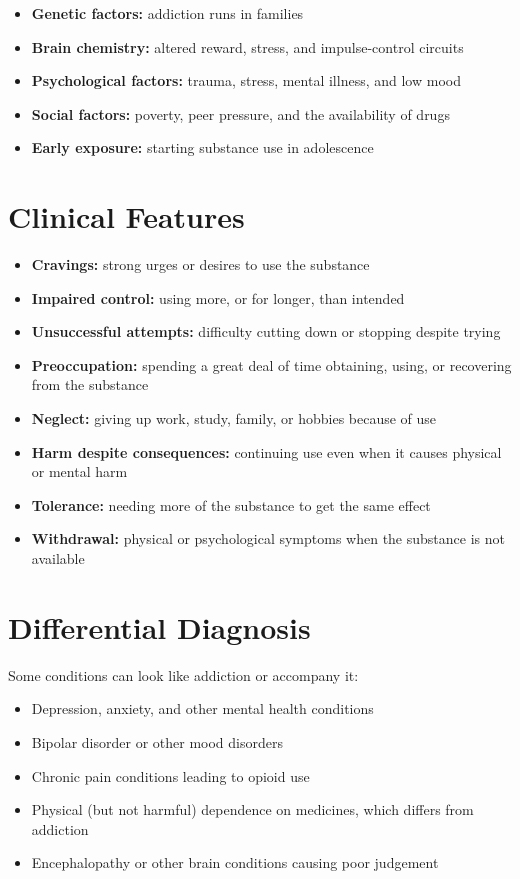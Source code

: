 \begin{itemize}
    \item \textbf{Genetic factors:} addiction runs in families
    \item \textbf{Brain chemistry:} altered reward, stress, and impulse-control circuits
    \item \textbf{Psychological factors:} trauma, stress, mental illness, and low mood
    \item \textbf{Social factors:} poverty, peer pressure, and the availability of drugs
    \item \textbf{Early exposure:} starting substance use in adolescence
\end{itemize}

\section*{Clinical Features}
\begin{itemize}
    \item \textbf{Cravings:} strong urges or desires to use the substance
    \item \textbf{Impaired control:} using more, or for longer, than intended
    \item \textbf{Unsuccessful attempts:} difficulty cutting down or stopping despite trying
    \item \textbf{Preoccupation:} spending a great deal of time obtaining, using, or recovering from the substance
    \item \textbf{Neglect:} giving up work, study, family, or hobbies because of use
    \item \textbf{Harm despite consequences:} continuing use even when it causes physical or mental harm
    \item \textbf{Tolerance:} needing more of the substance to get the same effect
    \item \textbf{Withdrawal:} physical or psychological symptoms when the substance is not available
\end{itemize}

\section*{Differential Diagnosis}
Some conditions can look like addiction or accompany it:

\begin{itemize}
    \item Depression, anxiety, and other mental health conditions
    \item Bipolar disorder or other mood disorders
    \item Chronic pain conditions leading to opioid use
    \item Physical (but not harmful) dependence on medicines, which differs from addiction
    \item Encephalopathy or other brain conditions causing poor judgement
\end{itemize}

